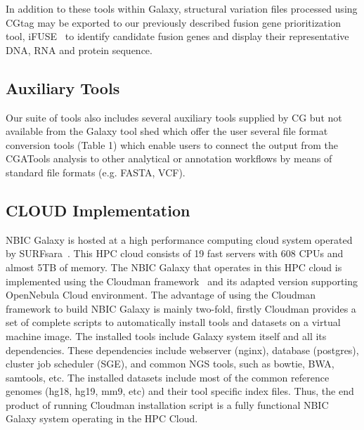 \documentclass[10pt]{bmc_article}
\newenvironment{bmcformat}{\begin{raggedright}\baselineskip20pt\sloppy\setboolean{publ}{false}}{\end{raggedright}\baselineskip20pt\sloppy}
\begin{document}
\begin{bmcformat}
In addition to these tools within Galaxy, structural variation files processed using CGtag may be exported to our previously described fusion gene prioritization tool, iFUSE~\cite{url-ifuse} to identify candidate fusion genes and display their representative DNA, RNA and protein sequence. 

\subsection*{Auxiliary Tools}
Our suite of tools also includes several auxiliary tools supplied by CG but not available from the Galaxy tool shed which offer the user several file format conversion tools (Table 1) which enable users to connect the output from the CGATools analysis to other analytical or annotation workflows by means of standard file formats (e.g. FASTA, VCF). 

\subsection*{CLOUD Implementation}
NBIC Galaxy is hosted at a high performance computing cloud system operated by SURFsara~\cite{url-surfsara}. This HPC cloud consists of 19 fast servers with 608 CPUs and almost 5TB of memory. The NBIC Galaxy that operates in this HPC cloud is implemented using the Cloudman framework~\cite{afgan} and its adapted version supporting OpenNebula Cloud environment. 
The advantage of using the Cloudman framework to build NBIC Galaxy is mainly two-fold, firstly  Cloudman provides a set of complete scripts to automatically install tools and datasets on a virtual machine image. The installed tools include Galaxy system itself and all its dependencies. These dependencies include webserver (nginx), database (postgres), cluster job scheduler (SGE), and common NGS tools, such as bowtie, BWA, samtools, etc. The installed datasets include most of the common reference genomes (hg18, hg19, mm9, etc) and their tool specific index files. Thus, the end product of running Cloudman installation script is a fully functional NBIC Galaxy system operating in the HPC Cloud. 


\end{bmcformat}
\end{document}
